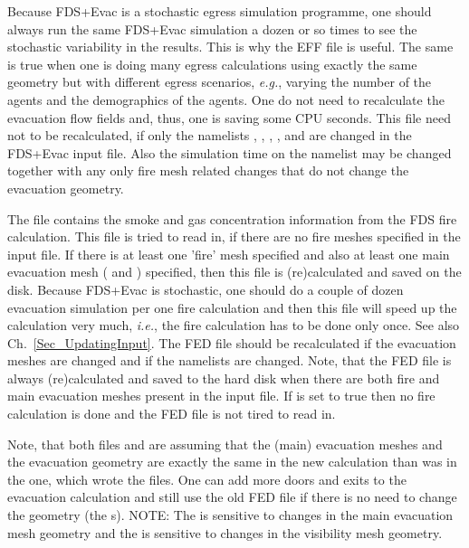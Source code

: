 \documentclass[12pt,a4paper,final,twoside]{stylevk}
\begin{document}
Because FDS+Evac is a stochastic egress simulation programme, one
should always run the same FDS+Evac simulation a dozen or so times to
see the stochastic variability in the results.  This is why the EFF
file is useful.  The same is true when one is doing many egress
calculations using exactly the same geometry but with different egress
scenarios, \emph{e.g.}, varying the number of the agents and the
demographics of the agents.  One do not need to recalculate the
evacuation flow fields and, thus, one is saving some CPU seconds.
This file need not to be recalculated, if only the namelists
, , , , 
and  are changed in the FDS+Evac input file.  Also the
simulation time  on the  namelist may be
changed together with any only fire mesh related changes that do not
change the evacuation geometry.


The file  contains the smoke and gas
concentration information from the FDS fire calculation.  This file is
tried to read in, if there are no fire meshes specified in the input
file.  If there is at least one 'fire' mesh specified and also at
least one main evacuation mesh ( and
)  specified, then this file is
(re)calculated and saved on the disk.  Because FDS+Evac is stochastic,
one should do a couple of dozen evacuation simulation per one fire
calculation and then this file will speed up the calculation very
much, \emph{i.e.}, the fire calculation has to be done only once.  See
also Ch.~\ref{Sec_UpdatingInput}.  The FED file should be recalculated
if the evacuation meshes are changed and if the namelists 
are changed.  Note, that the FED file is always (re)calculated and
saved to the hard disk when there are both fire and main evacuation
meshes present in the input file.  If  is set
to true then no fire calculation is done and the FED file is not tired
to read in.


Note, that both files  and
 are assuming that the (main) evacuation meshes
and the evacuation geometry are exactly the same in the new
calculation than was in the one, which wrote the files.  One can add
more doors and exits to the evacuation calculation and still use the
old FED file if there is no need to change the geometry (the
s).  NOTE: The  is sensitive to
changes in the main evacuation mesh geometry and the
 is sensitive to changes in the visibility mesh
geometry.
\end{document}
